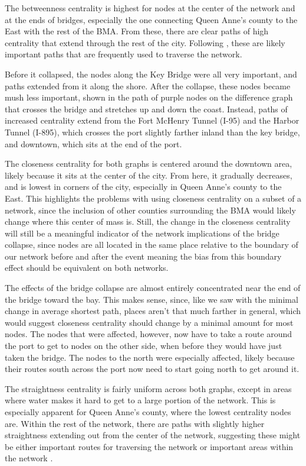 \documentclass[11pt]{article}
\numberwithin{equation}{section} %
\numberwithin{figure}{section} %
\numberwithin{table}{section} %
\theoremstyle{definition}
\begin{document}
The betweenness centrality is highest for nodes at the center of the network and at the ends of bridges, especially the one connecting Queen Anne's county to the East with the rest of the BMA. From these, there are clear paths of high centrality that extend through the rest of the city. Following \cite{Porta06}, these are likely important paths that are frequently used to traverse the network.

Before it collapsed, the nodes along the Key Bridge were all very important, and paths extended from it along the shore. After the collapse, these nodes became mush less important, shown in the path of purple nodes on the difference graph that crosses the bridge and stretches up and down the coast. Instead, paths of increased centrality extend from the Fort McHenry Tunnel (I-95) and the Harbor Tunnel (I-895), which crosses the port slightly farther inland than the key bridge, and downtown, which sits at the end of the port.

The closeness centrality for both graphs is centered around the downtown area, likely because it sits at the center of the city. From here, it gradually decreases, and is lowest in corners of the city, especially in Queen Anne's county to the East. This highlights the problems with using closeness centrality on a subset of a network, since the inclusion of other counties surrounding the BMA would likely change where this center of mass is. Still, the change in the closeness centrality will still be a meaningful indicator of the network implications of the bridge collapse, since nodes are all located in the same place relative to the boundary of our network before and after the event meaning the bias from this boundary effect should be equivalent on both networks.

The effects of the bridge collapse are almost entirely concentrated near the end of the bridge toward the bay. This makes sense, since, like we saw with the minimal change in average shortest path, places aren't that much farther in general, which would suggest closeness centrality should change by a minimal amount for most nodes. The nodes that were affected, however, now have to take a route around the port to get to nodes on the other side, when before they would have just taken the bridge. The nodes to the north were especially affected, likely because their routes south across the port now need to start going north to get around it.

The straightness centrality is fairly uniform across both graphs, except in areas where water makes it hard to get to a large portion of the network. This is especially apparent for Queen Anne's county, where the lowest centrality nodes are. Within the rest of the network, there are paths with slightly higher straightness extending out from the center of the network, suggesting these might be either important routes for traversing the network or important areas within the network \parencites{Porta06}{Wang11}.
\end{document}
